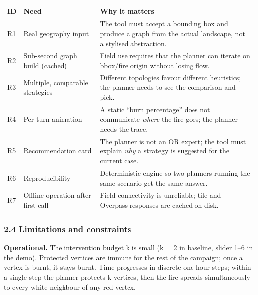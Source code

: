 \documentclass[
  11pt,
]{article}
\newcounter{none} %
\begin{document}
{\def\LTcaptype{none} %
\begin{longtable}[]{@{}
  >{\raggedright\arraybackslash}p{}
  >{\raggedright\arraybackslash}p{}
  >{\raggedright\arraybackslash}p{}@{}}
\toprule\noalign{}
\begin{minipage}[b]{\linewidth}\raggedright
ID
\end{minipage} & \begin{minipage}[b]{\linewidth}\raggedright
Need
\end{minipage} & \begin{minipage}[b]{\linewidth}\raggedright
Why it matters
\end{minipage} \\
\midrule\noalign{}
\endhead
\bottomrule\noalign{}
\endlastfoot
R1 & Real geography input & The tool must accept a bounding box and
produce a graph from the actual landscape, not a stylised
abstraction. \\
R2 & Sub-second graph build (cached) & Field use requires that the
planner can iterate on bbox/fire origin without losing flow. \\
R3 & Multiple, comparable strategies & Different topologies favour
different heuristics; the planner needs to see the comparison and
pick. \\
R4 & Per-turn animation & A static ``burn percentage'' does not
communicate \emph{where} the fire goes; the planner needs the trace. \\
R5 & Recommendation card & The planner is not an OR expert; the tool
must explain \emph{why} a strategy is suggested for the current case. \\
R6 & Reproducibility & Deterministic engine so two planners running the
same scenario get the same answer. \\
R7 & Offline operation after first call & Field connectivity is
unreliable; tile and Overpass responses are cached on disk. \\
\end{longtable}
}

\subsubsection{2.4 Limitations and
constraints}\label{limitations-and-constraints}

\textbf{Operational.} The intervention budget k is small (k = 2 in
baseline, slider 1--6 in the demo). Protected vertices are immune for
the rest of the campaign; once a vertex is burnt, it stays burnt. Time
progresses in discrete one-hour steps; within a single step the planner
protects k vertices, then the fire spreads simultaneously to every white
neighbour of any red vertex.
\end{document}

